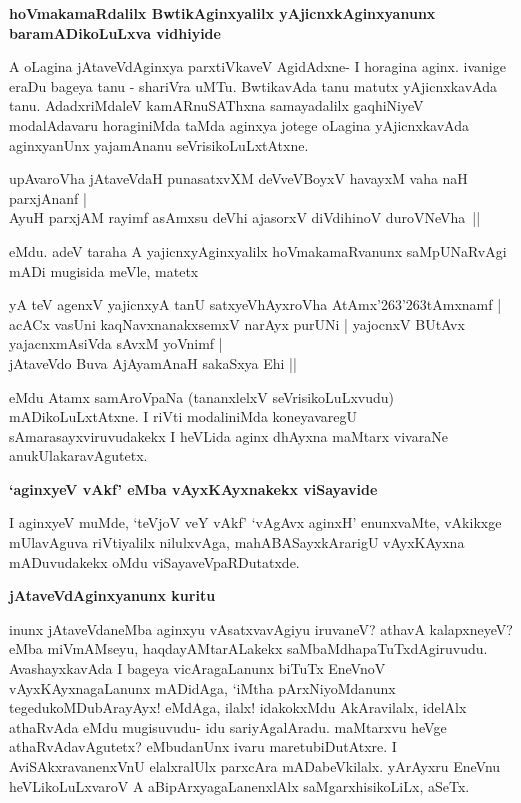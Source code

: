 {\bigskip
\noindent
{\large\bf hoVmakamaRdalilx BwtikAginxyalilx yAjicnxkAginxyanunx baramADikoLuLxva vidhiyide}}\label{page211}
\medskip

\noindent
A oLagina jAtaveVdAginxya parxtiVkaveV AgidAdxne- I horagina aginx. ivanige eraDu bageya tanu - shariVra uMTu. BwtikavAda tanu matutx yAjicnxkavAda tanu. AdadxriMdaleV kamARnuSAThxna samayadalilx gaqhiNiyeV modalAdavaru horaginiMda taMda aginxya jotege oLagina yAjicnxkavAda aginxyanUnx yajamAnanu seVrisikoLuLxtAtxne. 

\begin{shloka}
upAvaroVha jAtaveVdaH punasatxvXM deVveVBoyxV havayxM vaha naH parxjAnanf |\\\label{211}
AyuH parxjAM rayimf asAmxsu deVhi ajasorxV diVdihinoV duroVNeVha~||
\end{shloka}

\noindent
eMdu. adeV taraha A yajicnxyAginxyalilx hoVmakamaRvanunx saMpUNaRvAgi mADi mugi\-sida meVle, matetx

\begin{shloka}
yA teV agenxV yajicnxyA tanU satxyeVhAyxroVha AtAmx\char'263\char'263tAmxnamf |\\\label{211}
acACx vasUni kaqNavxnanakxsemxV narAyx purUNi | yajocnxV BUtAvx yajacnxmAsiVda sAvxM yoVnimf |\\
jAtaveVdo Buva AjAyamAnaH sakaSxya Ehi ||
\end{shloka}

\noindent
eMdu Atamx samAroVpaNa (tananxlelxV seVrisikoLuLxvudu) mADikoLuLxtAtxne. I riVti modali\-niMda koneyavaregU sAmarasayxviruvudakekx I heVLida aginx dhAyxna maMtarx vivaraNe anukUlakaravAgutetx.

{\bigskip
\noindent
{\large\bf `aginxyeV vAkf' eMba vAyxKAyxnakekx viSayavide}}\label{page211}
\medskip

\noindent
I aginxyeV muMde, `teVjoV veY vAkf'\label{212} `vAgAvx aginxH'\label{212} enunxvaMte, vAkikxge mUlavAguva riVti\-yalilx nilulxvAga, mahABASayxkArarigU vAyxKAyxna mADuvudakekx oMdu viSayaveVpaRDutatxde.

{\bigskip
\noindent
{\large\bf jAtaveVdAginxyanunx kuritu}}\label{page212}
\medskip

\noindent
inunx jAtaveVdaneMba aginxyu vAsatxvavAgiyu iruvaneV? athavA kalapxneyeV? eMba miVmAM\-seyu, haqdayAMtarALakekx saMbaMdhapaTuTxdAgiruvudu. Avashayxka\-vAda I bageya vicAragaLanunx biTuTx EneVnoV vAyxKAyxnagaLanunx mADidAga, `iMtha pArxNiyoMdanunx tegedukoMDubArayAyx! eMdAga, ilalx! idakokxMdu AkAravilalx, idelAlx athaRvAda eMdu mugisuvudu- idu sariyAgalAradu. maMtarxvu heVge athaRvAdavAgutetx? eMbudanUnx ivaru maretubiDutAtxre. I AviSAkxravanenxVnU elalxralUlx parxcAra mADabeVkilalx. yArAyxru EneVnu heVLikoLuLxvaroV A aBipArxyagaLanenxlAlx saMgarx\-hisi\-koLiLx, aSeTx.

